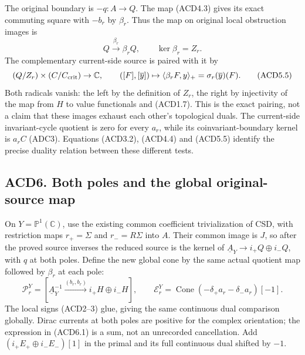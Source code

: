 The original boundary is \(-q:A\to Q\). The map (ACD4.3) gives its exact
commuting square with \(-b_r\) by \(\beta_r\). Thus the map on original
local obstruction images is \[
Q\xrightarrow{\beta_r}\beta_rQ,\qquad \ker\beta_r=Z_r.
\tag{ACD5.4}
\] The complementary current-side source is paired with it by \[
(Q/Z_r)\times(C/C_{\rm crit})\to\mathbb C,
\qquad ([F],[\overline y])\mapsto
\langle\beta_rF,y\rangle_+=\sigma_r(\overline y)(F).
\tag{ACD5.5}
\] Both radicals vanish: the left by the definition of \(Z_r\), the
right by injectivity of the map from \(H\) to value functionals and
(ACD1.7). This is the exact pairing, not a claim that these images
exhaust each other's topological duals. The current-side invariant-cycle
quotient is zero for every \(a_r\), while its coinvariant-boundary
kernel is \(a_rC\) (ADC3). Equations (ACD3.2), (ACD4.4) and (ACD5.5)
identify the precise duality relation between these different tests.

\subsection{ACD6. Both poles and the global original-source
map}\label{acd6.-both-poles-and-the-global-original-source-map}

On \(Y=\mathbb P^1(\mathbb C)\), use the existing common coefficient
trivialization of CSD, with restriction maps \(r_+=\Sigma\) and
\(r_-=R\Sigma\) into \(A\). Their common image is \(J\), so after the
proved source inverses the reduced source is the kernel of
\(\underline A_Y\to i_+Q\oplus i_-Q\), with \(q\) at both poles. Define
the new global cone by the same actual quotient map followed by
\(\beta_r\) at each pole: \[
\mathscr P_r^Y=[\underline A_Y^{-1}\xrightarrow{(b_r,b_r)}
i_+H\oplus i_-H],\qquad
\mathscr E_r^Y=\operatorname{Cone}(-\delta_+a_r-\delta_-a_r)[-1].
\tag{ACD6.1}
\] The local signs (ACD2--3) glue, giving the same continuous dual
comparison globally. Dirac currents at both poles are positive for the
complex orientation; the expression in (ACD6.1) is a sum, not an
unrecorded cancellation. Add \((i_+E_+\oplus i_-E_-)[1]\) in the primal
and its full continuous dual shifted by \(-1\).

